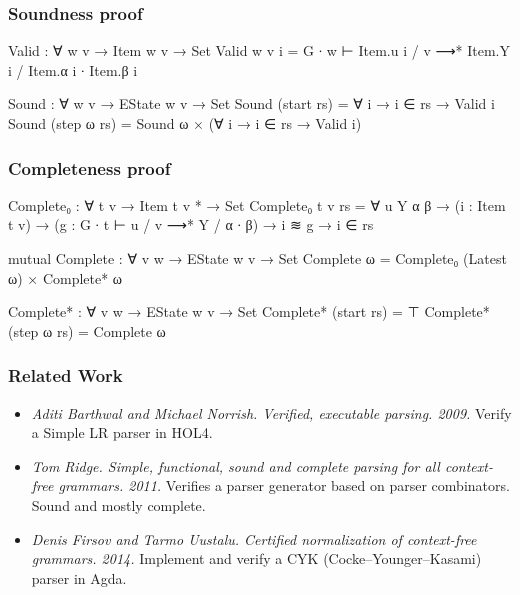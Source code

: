 \begin{frame}
	\frametitle{Soundness proof}
	\begin{itemize}
		
	\end{itemize}
	\begin{code}
		  Valid : ∀ {w v} → Item w v → Set
		  Valid {w} {v} i =
		    G ∙ w ⊢ Item.u i / v ⟶* Item.Y i / Item.α i ∙ Item.β i

		  Sound : ∀ {w v} → EState w v → Set
		  Sound (start rs) = ∀ {i} → i ∈ rs → Valid i
		  Sound (step ω rs) = Sound ω × (∀ {i} → i ∈ rs → Valid i)
  	\end{code}
\end{frame}

\begin{frame}
	\frametitle{Completeness proof}
	\begin{code}
		  Complete₀ : ∀ {t v} → Item t v * → Set
		  Complete₀ {t} {v} rs = ∀ {u Y α β} →
		    (i : Item t v) →
		    (g : G ∙ t ⊢ u / v ⟶* Y / α ∙ β) →
		    i ≋ g →
		    i ∈ rs

		  mutual
		    Complete : ∀ {v w} → EState w v → Set
		    Complete ω = Complete₀ (Latest ω) × Complete* ω

		    Complete* : ∀ {v w} → EState w v → Set
		    Complete* (start rs) = ⊤
		    Complete* (step ω rs) = Complete ω
	\end{code}
\end{frame}

\begin{frame}
	\frametitle{Related Work}
	\begin{itemize}
		\item
		
			\emph{Aditi Barthwal and Michael Norrish. Verified, executable
			parsing. 2009.} Verify a Simple LR parser in HOL4.

		\item

			\emph{Tom Ridge. Simple, functional, sound and complete parsing for
			all context- free grammars. 2011.} Verifies a parser generator 
			based on parser combinators. Sound and mostly complete.

		\item 
		
			\emph{Denis Firsov and Tarmo Uustalu. Certified normalization of
			context-free grammars. 2014.}  Implement and verify a CYK 
			(Cocke–Younger–Kasami) parser in Agda.
		
	\end{itemize}
\end{frame}

